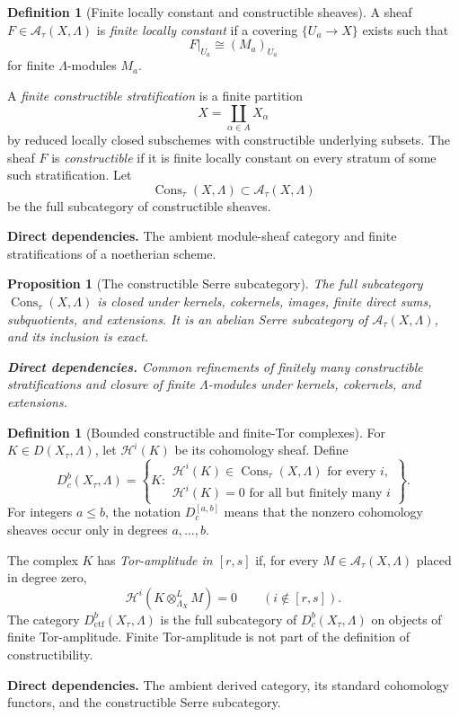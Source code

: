 \documentclass[10pt]{article}
\newtheorem{proposition}[theorem]{Proposition}
\theoremstyle{definition}
\newtheorem{definition}[theorem]{Definition}
\newcommand{\Dbc}{D^b_c}
\newcommand{\Dctf}{D^b_{\mathrm{ctf}}}
\newcommand{\Cons}{\operatorname{Cons}}
\newcommand{\deps}[1]{\par\smallskip\noindent\textbf{Direct dependencies.} #1}
\begin{document}
\begin{definition}[Finite locally constant and constructible sheaves]
A sheaf $F\in\mathcal A_\tau(X,\Lambda)$ is \emph{finite locally constant}
if a covering $\{U_a\to X\}$ exists such that
\[
 F|_{U_a}\cong (M_a)_{U_a}
\]
for finite $\Lambda$-modules $M_a$.

A \emph{finite constructible stratification} is a finite partition
\[
 X=\coprod_{\alpha\in A}X_\alpha
\]
by reduced locally closed subschemes with constructible underlying subsets.
The sheaf $F$ is \emph{constructible} if it is finite locally constant on
every stratum of some such stratification.  Let
\[
 \Cons_\tau(X,\Lambda)\subset\mathcal A_\tau(X,\Lambda)
\]
be the full subcategory of constructible sheaves.
\deps{The ambient module-sheaf category and finite stratifications of a
noetherian scheme.}
\end{definition}

\begin{proposition}[The constructible Serre subcategory]
The full subcategory $\Cons_\tau(X,\Lambda)$ is closed under kernels,
cokernels, images, finite direct sums, subquotients, and extensions.  It is
an abelian Serre subcategory of $\mathcal A_\tau(X,\Lambda)$, and
its inclusion is exact.
\deps{Common refinements of finitely many constructible stratifications and
closure of finite $\Lambda$-modules under kernels, cokernels, and extensions.}
\end{proposition}

\begin{definition}[Bounded constructible and finite-Tor complexes]
For $K\in D(X_\tau,\Lambda)$, let $\mathcal H^i(K)$ be its cohomology sheaf.
Define
\[
 \Dbc(X_\tau,\Lambda)
 =\left\{K:\begin{array}{l}
       \mathcal H^i(K)\in\Cons_\tau(X,\Lambda)\text{ for every }i,\\
       \mathcal H^i(K)=0\text{ for all but finitely many }i
   \end{array}\right\}.
\]
For integers $a\leq b$, the notation $D_c^{[a,b]}$ means that the nonzero
cohomology sheaves occur only in degrees $a,\ldots,b$.

The complex $K$ has \emph{Tor-amplitude in $[r,s]$} if, for every
$M\in\mathcal A_\tau(X,\Lambda)$ placed in degree zero,
\[
 \mathcal H^i(K\otimes^L_{\Lambda_X}M)=0
 \qquad(i\notin[r,s]).
\]
The category $\Dctf(X_\tau,\Lambda)$ is the full subcategory of
$\Dbc(X_\tau,\Lambda)$ on objects of finite Tor-amplitude.  Finite
Tor-amplitude is not part of the definition of constructibility.
\deps{The ambient derived category, its standard cohomology functors, and the
constructible Serre subcategory.}
\end{definition}
\end{document}
